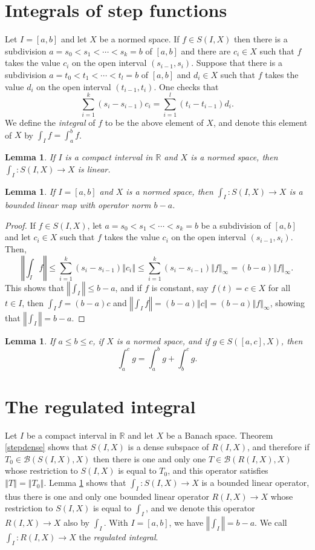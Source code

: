 \documentclass{article}
\newcommand{\norm}[1]{\left\Vert #1 \right\Vert}
\newtheorem{lemma}[theorem]{Lemma}
\theoremstyle{definition}
\begin{document}
\section{Integrals of step functions}
Let $I=[a,b]$ and let $X$ be a normed space. If $f \in S(I,X)$ then there is a subdivision $a=s_0<s_1<\cdots<s_k=b$ of $[a,b]$ and there are
$c_i \in X$ such that $f$ takes the value $c_i$ on the open interval $(s_{i-1},s_i)$. Suppose that there is a subdivision $a=t_0<t_1<\cdots<t_l=b$ of $[a,b]$ and 
$d_i \in X$ such that $f$ takes the value $d_i$ on the open interval $(t_{i-1},t_i)$. 
One checks that
\[
\sum_{i=1}^k (s_i-s_{i-1})c_i = \sum_{i=1}^l (t_i-t_{i-1})d_i.
\]
We define the {\em integral}  of $f$ to be the above element of $X$, and denote this element of $X$ by $\int_I f=\int_a^b f$.

\begin{lemma}
If $I$ is a compact interval in $\mathbb{R}$ and $X$ is a normed space, then $\int_I:S(I,X) \to X$ is linear.
\end{lemma}

\begin{lemma}
If $I=[a,b]$ and $X$ is a normed space, then $\int_I:S(I,X) \to X$ is a bounded linear map with operator norm $b-a$.
\label{operatornorm}
\end{lemma}
\begin{proof}
If $f \in S(I,X)$, let $a=s_0<s_1<\cdots<s_k=b$ be a subdivision of $[a,b]$ and let $c_i \in X$ such that $f$ takes the value 
$c_i$ on the open interval $(s_{i-1},s_i)$. Then,
\[
\norm{\int_I f} \leq \sum_{i=1}^k (s_i-s_{i-1}) \norm{c_i} \leq
\sum_{i=1}^k (s_i-s_{i-1}) \norm{f}_\infty 
=(b-a)\norm{f}_\infty.
\]
This shows that $\norm{\int_I} \leq b-a$, and if $f$ is constant, say $f(t)=c \in X$ for all $t \in I$, then $\int_I f = (b-a)c$ and 
$\norm{\int_I f}=(b-a)\norm{c}=(b-a)\norm{f}_\infty$, showing that $\norm{\int_I}=b-a$.
\end{proof}

\begin{lemma}
If $a \leq b \leq c$, if $X$ is a normed space, and if $g \in S([a,c],X)$, then
\[
\int_a^c g = \int_a^b g + \int_b^c g.
\]
\label{chaslesstep}
\end{lemma}



\section{The regulated integral}
Let $I$ be a compact interval in $\mathbb{R}$ and let $X$ be a Banach space.
Theorem \ref{stepdense} shows that $S(I,X)$ is a dense subspace of $R(I,X)$, and therefore
if $T_0 \in \mathscr{B}(S(I,X), X)$ then there is one and only one 
$T \in \mathscr{B}(R(I,X), X)$ whose restriction to $S(I,X)$ is equal to $T_0$, and this operator satisfies $\norm{T}=\norm{T_0}$. 
 Lemma \ref{operatornorm}
 shows that $\int_I:S(I,X) \to X$ is a bounded linear operator, thus there is one and only one bounded linear
 operator
 $R(I,X) \to X$ whose restriction to $S(I,X)$ is equal to $\int_I$, and we denote this operator $R(I,X) \to X$ also by $\int_I$. 
 With $I=[a,b]$, we have $\norm{\int_I}=b-a$. We call $\int_I:R(I,X) \to X$ the {\em regulated integral}.
 
\end{document}
